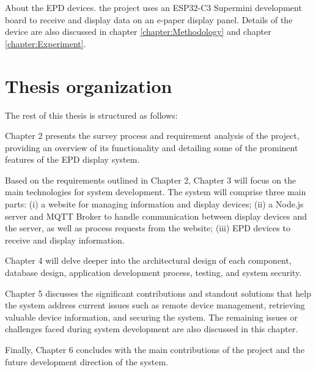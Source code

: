 \documentclass[../Main.tex]{subfiles}
\begin{document}
About the \gls{EPD} devices. the project uses an ESP32-C3 Supermini development board to receive and display data on an e-paper display panel. Details of the device are also discussed in chapter \ref{chapter:Methodology} and chapter \ref{chapter:Experiment}.

\section{Thesis organization}
\label{section:1.4}

The rest of this thesis is structured as follows:

Chapter 2 presents the survey process and requirement analysis of the project, providing an overview of its functionality and detailing some of the prominent features of the \gls{EPD} display system.

Based on the requirements outlined in Chapter 2, Chapter 3 will focus on the main technologies for system development. The system will comprise three main parts: (i) a website for managing information and display devices; (ii) a Node.js server and MQTT Broker to handle communication between display devices and the server, as well as process requests from the website; (iii) \gls{EPD} devices to receive and display information.

Chapter 4 will delve deeper into the architectural design of each component, database design, application development process, testing, and system security.

Chapter 5 discusses the significant contributions and standout solutions that help the system address current issues such as remote device management, retrieving valuable device information, and securing the system. The remaining issues or challenges faced during system development are also discussed in this chapter.

Finally, Chapter 6 concludes with the main contributions of the project and the future development direction of the system.
\end{document}
